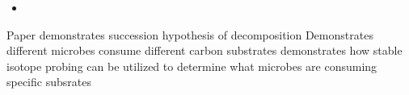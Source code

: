 \begin{itemize}
\item 
\end{itemize}Paper demonstrates succession hypothesis of decomposition
Demonstrates different microbes consume different carbon substrates
demonstrates how stable isotope probing can be utilized to determine what microbes are consuming specific subsrates
